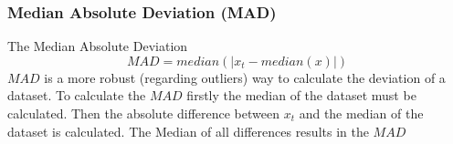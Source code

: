\subsubsection{Median Absolute Deviation (\ac{MAD})}
The Median Absolute Deviation 
$$
MAD = median(|x_t - median(x)|)
$$
$MAD$ is a more robust (regarding outliers) way to calculate the deviation of a dataset. To calculate the $MAD$ firstly the median of the dataset must be calculated. Then the absolute difference between $x_t$ and the median of the dataset is calculated. The Median of all differences results in the $MAD$
\cite{leysDetectingOutliersNot2013, mehrangOutlierDetectionWeight2015}





